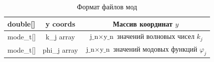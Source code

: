 \documentclass{fefu}
\begin{document}
\begin{table}[p]
\begin{subtable}[t]{\linewidth}
\begin{tabular}{|C{2cm}|c|c|}
                            \hline
                            \textsf{double[]} & y coords & Массив координат $y$\\
                            \hline
                            \textsf{mode\_t[]} & k\_j array & $\text{j\_n}\times\text{y\_n}$ значений волновых чисел $k_j$\\
                            \hline
                            \textsf{mode\_t[]} & phi\_j array & $\text{j\_n}\times\text{y\_n}$ значений модовых функций $\varphi_j$\\
                            \hline
                        \end{tabular}
                    \end{subtable}
                    \caption{\label{tbl::bin_mod}Формат файлов мод}
                \end{table}
\end{document}
